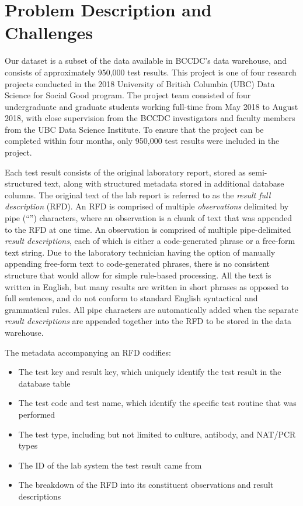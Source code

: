 \documentclass[sigconf]{acmart}
\begin{document}
\section{Problem Description and Challenges} \label{dataset}

Our dataset is a subset of the data available in BCCDC's data warehouse, and consists of approximately 950,000 test results. This project is one of four research projects conducted in the 2018 University of British Columbia (UBC) Data Science for Social Good program. The project team consisted of four undergraduate and graduate students working full-time from May 2018 to August 2018, with close supervision from the BCCDC investigators and faculty members from the UBC Data Science Institute. To ensure that the project can be completed within four months, only 950,000 test results were included in the project.

Each test result consists of the original laboratory report, stored as semi-structured text, along with structured metadata stored in additional database columns. The original text of the lab report is referred to as the \textit{result full description} (RFD). An RFD is comprised of multiple \textit{observations} delimited by pipe (``\textbar'') characters, where an observation is a chunk of text that was appended to the RFD at one time. An observation is comprised of multiple pipe-delimited \textit{result descriptions}, each of which is either a code-generated phrase or a free-form text string. Due to the laboratory technician having the option of manually appending free-form text to code-generated phrases, there is no consistent structure that would allow for simple rule-based processing. All the text is written in English, but many results are written in short phrases as opposed to full sentences, and do not conform to standard English syntactical and grammatical rules. All pipe characters are automatically added when the separate \textit{result descriptions} are appended together into the RFD to be stored in the data warehouse.

The metadata accompanying an RFD codifies:

\begin{itemize}
    \item The test key and result key, which uniquely identify the test result in the database table
    \item The test code and test name, which identify the specific test routine that was performed
    \item The test type, including but not limited to culture, antibody, and NAT/PCR types
    \item The ID of the lab system the test result came from
    \item The breakdown of the RFD into its constituent observations and result descriptions
\end{itemize}
\end{document}
